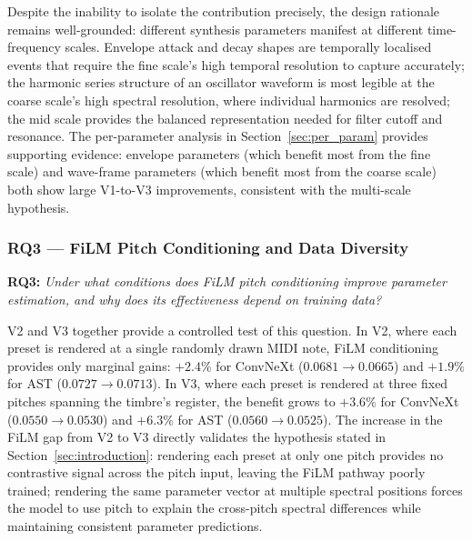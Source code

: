 \noindent \newline
Despite the inability to isolate the contribution precisely, the design rationale remains well-grounded: different synthesis parameters manifest at different time-frequency scales. Envelope attack and decay shapes are temporally localised events that require the fine scale's high temporal resolution to capture accurately; the harmonic series structure of an oscillator waveform is most legible at the coarse scale's high spectral resolution, where individual harmonics are resolved; the mid scale provides the balanced representation needed for filter cutoff and resonance. The per-parameter analysis in Section~\ref{sec:per_param} provides supporting evidence: envelope parameters (which benefit most from the fine scale) and wave-frame parameters (which benefit most from the coarse scale) both show large V1-to-V3 improvements, consistent with the multi-scale hypothesis.

\subsubsection{RQ3 — FiLM Pitch Conditioning and Data Diversity}

\noindent
\textbf{RQ3:} \textit{Under what conditions does FiLM pitch conditioning improve parameter estimation, and why does its effectiveness depend on training data?}

\noindent \newline
V2 and V3 together provide a controlled test of this question. In V2, where each preset is rendered at a single randomly drawn MIDI note, FiLM conditioning provides only marginal gains: $+2.4\%$ for ConvNeXt ($0.0681 \to 0.0665$) and $+1.9\%$ for AST ($0.0727 \to 0.0713$). In V3, where each preset is rendered at three fixed pitches spanning the timbre's register, the benefit grows to $+3.6\%$ for ConvNeXt ($0.0550 \to 0.0530$) and $+6.3\%$ for AST ($0.0560 \to 0.0525$). The increase in the FiLM gap from V2 to V3 directly validates the hypothesis stated in Section~\ref{sec:introduction}: rendering each preset at only one pitch provides no contrastive signal across the pitch input, leaving the FiLM pathway poorly trained; rendering the same parameter vector at multiple spectral positions forces the model to use pitch to explain the cross-pitch spectral differences while maintaining consistent parameter predictions.

